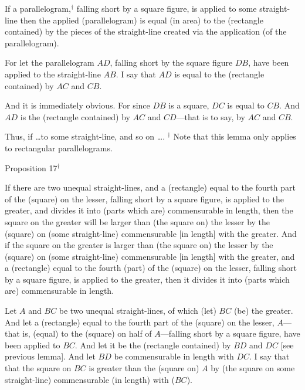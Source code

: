 If a parallelogram,$^\dag$
 falling short by a square figure, is applied to some straight-line then the applied (parallelogram) is equal (in area) to the (rectangle contained) by the
pieces of the straight-line created via the application (of the parallelogram).

\epsfysize=1.3in
\centerline{}

For let the parallelogram $AD$, falling short by the square figure $DB$, have been applied to the straight-line $AB$. I say that $AD$ is equal to
the (rectangle contained) by $AC$ and $CB$.

And it is immediately obvious. For since $DB$ is a square, $DC$ is
equal to $CB$. And $AD$ is the (rectangle contained) by $AC$ and
$CD$---that is to say, by $AC$ and $CB$.

Thus, if \ldots to some straight-line, and so on \ldots.
{\footnotesize\noindent$^\dag$  Note that this lemma only applies to rectangular parallelograms.}


\begin{center}
{\large Proposition 17}$^\dag$
\end{center}

If there are two unequal straight-lines,
and a (rectangle) equal to the fourth part of the (square) on the
lesser, falling short by a square figure, is applied to the greater, and
divides it into (parts which are) commensurable in length, then
 the  square on the greater  will be  larger than (the  square on) the lesser  by the (square)
on (some straight-line) commensurable [in length] with the greater.
And if the square on the greater is larger than (the square on) the lesser  by the (square)
on (some straight-line) commensurable [in length] with the greater, and
a (rectangle) equal to the fourth (part) of the (square) on the lesser,
falling short by a square figure, is applied to the greater, then it divides it into (parts
which are) commensurable in length.

Let $A$ and $BC$ be two unequal straight-lines, of which (let) $BC$ (be) the
greater. And let a (rectangle) equal to the fourth part of the (square) on the
lesser, $A$---that is, (equal) to the (square) on half of $A$---falling short by a
square figure, have been applied to $BC$. And let it be the (rectangle contained) by $BD$ and $DC$ [see previous lemma]. And let $BD$ be commensurable in length with
$DC$. I say that that the square on $BC$ is greater than the (square on) $A$ by (the square on some straight-line) commensurable (in length) with ($BC$).

